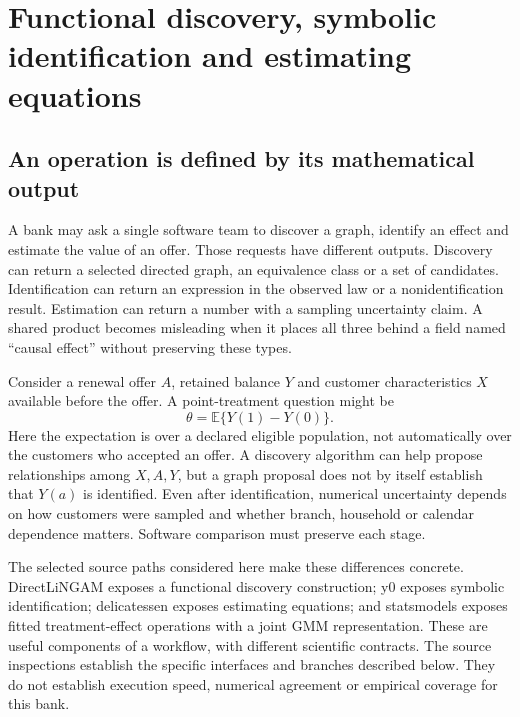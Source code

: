 \chapter{Functional discovery, symbolic identification and estimating equations}
\label{v13:sw-functional}

\section{An operation is defined by its mathematical output}

A bank may ask a single software team to discover a graph, identify an effect
and estimate the value of an offer. Those requests have different outputs.
Discovery can return a selected directed graph, an equivalence class or a set
of candidates. Identification can return an expression in the observed law or
a nonidentification result. Estimation can return a number with a sampling
uncertainty claim. A shared product becomes misleading when it places all
three behind a field named ``causal effect'' without preserving these types.

Consider a renewal offer $A$, retained balance $Y$ and customer characteristics
$X$ available before the offer. A point-treatment question might be
\[
 \theta=\mathbb E\{Y(1)-Y(0)\}.
\]
Here the expectation is over a declared eligible population, not automatically
over the customers who accepted an offer. A discovery algorithm can help
propose relationships among $X,A,Y$, but a graph proposal does not by itself
establish that $Y(a)$ is identified. Even after identification, numerical
uncertainty depends on how customers were sampled and whether branch, household
or calendar dependence matters. Software comparison must preserve each stage.

The selected source paths considered here make these differences concrete.
DirectLiNGAM exposes a functional discovery construction; y0 exposes symbolic
identification; delicatessen exposes estimating equations; and statsmodels
exposes fitted treatment-effect operations with a joint GMM representation.
These are useful components of a workflow, with different scientific contracts.
The source inspections establish the specific interfaces and branches described
below. They do not establish execution speed, numerical agreement or empirical
coverage for this bank. \cite{v13_sw_lingam,v13_sw_y0,v13_sw_delicatessen,v13_sw_statsmodels}

